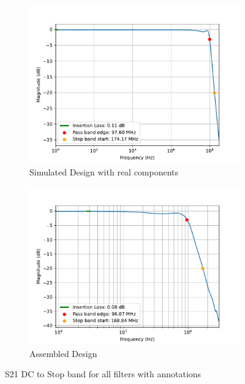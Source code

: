 \documentclass[letterpaper,12pt]{article}
\begin{document}
\begin{figure}[H]
    \medskip
  
    \begin{subfigure}[t]{.49\textwidth}
      \centering
      \includegraphics[width=\linewidth]{figures/6.real}
      \caption{Simulated Design with real components}
    \end{subfigure}
    \hfill
    \begin{subfigure}[t]{.49\textwidth}
      \centering
      \includegraphics[width=\linewidth]{figures/6.assembled}
      \caption{Assembled Design}
    \end{subfigure}
    \vspace{0.5cm}
    \caption{S21 DC to Stop band for all filters with annotations}
  \end{figure}
\end{document}
